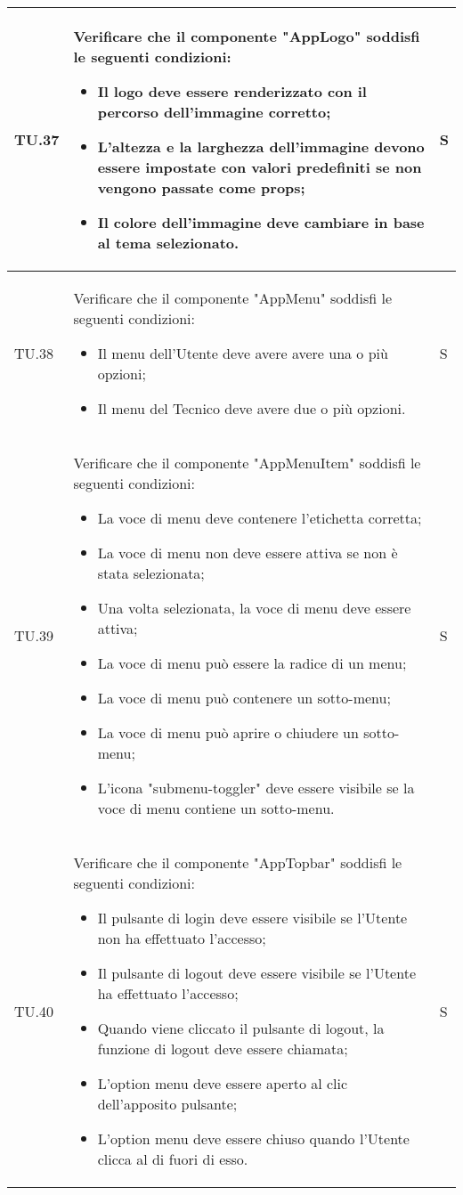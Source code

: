 \begin{adjustwidth}{-0.5cm}{-0.5cm}
\begin{longtable}{|P{1.5cm}|>{\raggedright}P{9.5cm}|>{\arraybackslash}P{1.5cm}|}
		\hline TU.37 & Verificare che il componente "AppLogo" soddisfi le seguenti condizioni:
    \begin{itemize}
      \item Il logo deve essere renderizzato con il percorso dell'immagine corretto;
			\item L'altezza e la larghezza dell'immagine devono essere impostate con valori predefiniti se non vengono passate come props;
			\item Il colore dell'immagine deve cambiare in base al tema selezionato.
    \end{itemize} & S \\

		\hline TU.38 & Verificare che il componente "AppMenu" soddisfi le seguenti condizioni:
    \begin{itemize}
      \item Il menu dell'Utente deve avere avere una o più opzioni;
			\item Il menu del Tecnico deve avere due o più opzioni.
    \end{itemize} & S \\

		\hline TU.39 & Verificare che il componente "AppMenuItem" soddisfi le seguenti condizioni:
    \begin{itemize}
      \item La voce di menu deve contenere l'etichetta corretta;
			\item La voce di menu non deve essere attiva se non è stata selezionata;
			\item Una volta selezionata, la voce di menu deve essere attiva;
			\item La voce di menu può essere la radice di un menu;
			\item La voce di menu può contenere un sotto-menu;
			\item La voce di menu può aprire o chiudere un sotto-menu;
			\item L'icona "submenu-toggler" deve essere visibile se la voce di menu contiene un sotto-menu.
    \end{itemize} & S \\

		\hline TU.40 & Verificare che il componente "AppTopbar" soddisfi le seguenti condizioni:
    \begin{itemize}
      \item Il pulsante di login deve essere visibile se l'Utente non ha effettuato l'accesso;
			\item Il pulsante di logout deve essere visibile se l'Utente ha effettuato l'accesso;
			\item Quando viene cliccato il pulsante di logout, la funzione di logout deve essere chiamata;
			\item L'option menu deve essere aperto al clic dell'apposito pulsante;
			\item L'option menu deve essere chiuso quando l'Utente clicca al di fuori di esso.
    \end{itemize} & S \\


\end{longtable}
\end{adjustwidth}
